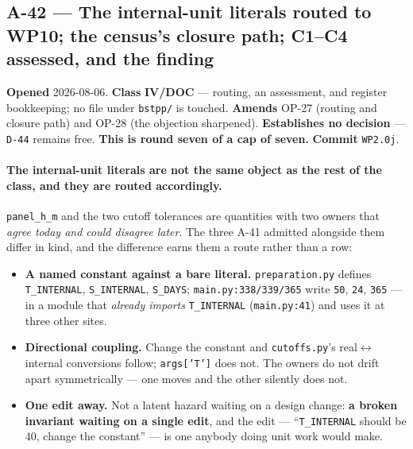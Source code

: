 \documentclass[
  10pt,
]{article}
\providecommand{\tightlist}{%
  \setlength{\itemsep}{0pt}\setlength{\parskip}{0pt}}
\begin{document}
\hypertarget{a-42}{%
\subsection{A-42 --- The internal-unit literals routed to WP10; the census's closure path; C1--C4 assessed, and the finding}\label{a-42}}

\textbf{Opened} 2026-08-06. \textbf{Class} \textbf{IV/DOC} --- routing, an assessment, and register bookkeeping; no file under \texttt{bstpp/} is touched. \textbf{Amends} OP-27 (routing and closure path) and OP-28 (the objection sharpened). \textbf{Establishes no decision} --- \texttt{D-44} remains free. \textbf{This is round seven of a cap of seven.} \textbf{Commit} \texttt{WP2.0j}.

\paragraph{The internal-unit literals are not the same object as the rest of the class, and they are routed accordingly.}
\texttt{panel\_h\_m} and the two cutoff tolerances are quantities with two owners that \emph{agree today and could disagree later}. The three A-41 admitted alongside them differ in kind, and the difference earns them a route rather than a row:

\begin{itemize}
\tightlist
\item \textbf{A named constant against a bare literal.} \texttt{preparation.py} defines \texttt{T\_INTERNAL}, \texttt{S\_INTERNAL}, \texttt{S\_DAYS}; \texttt{main.py:338/339/365} write \texttt{50}, \texttt{24}, \texttt{365} --- in a module that \emph{already imports} \texttt{T\_INTERNAL} (\texttt{main.py:41}) and uses it at three other sites.
\item \textbf{Directional coupling.} Change the constant and \texttt{cutoffs.py}'s real$\leftrightarrow$internal conversions follow; \texttt{args['T']} does not. The owners do not drift apart symmetrically --- one moves and the other silently does not.
\item \textbf{One edit away.} Not a latent hazard waiting on a design change: \textbf{a broken invariant waiting on a single edit}, and the edit --- ``\texttt{T\_INTERNAL} should be 40, change the constant'' --- is one anybody doing unit work would make.
\end{itemize}
\end{document}
